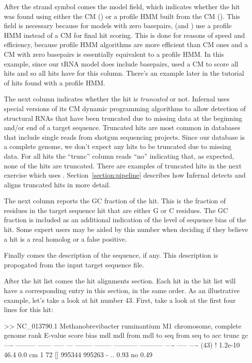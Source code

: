 After the strand symbol comes the model field, which indicates whether
the hit was found using either the CM () or a profile HMM
built from the CM (). This field is necessary because for
models with zero basepairs,  (and ) use a
profile HMM instead of a CM for final hit scoring. This is done for
reasons of speed and efficiency, because profile HMM algorithms are
more efficient than CM ones and a CM with zero basepairs is
essentially equivalent to a profile HMM. In this example, since our
tRNA model does include basepairs,  used a CM to score
all hits and so all hits have  for this column. There's an
example later in the tutorial of hits found with a profile HMM.

The next column indicates whether the hit is \emph{truncated} or
not. Infernal uses special versions of its CM dynamic programming
algorithms to allow detection of structural RNAs that have been
truncated due to missing data at the beginning and/or end of a target
sequence. Truncated hits are most common in databases that include
single reads from shotgun sequencing projects. Since our database is a
complete genome, we don't expect any hits to be truncated due to
missing data. For all hits the ``trunc'' column reads
``no'' indicating that, as expected, none of the hits are
truncated. There are examples of truncated hits in the next exercise
which uses . Section~\ref{section:pipeline} describes how
Infernal detects and aligns truncated hits in more detail.

The next column reports the GC fraction of the hit. This is the
fraction of residues in the target sequence hit that are either G or C
residues. The GC fraction is included as an additional indication of
the level of sequence bias of the hit. Some expert users may be aided
by this number when deciding if they believe a hit is a real homolog
or a false positive.

Finally comes the description of the sequence, if any. This
description is propogated from the input target sequence file.

After the hit list comes the hit alignments section. Each hit in 
the hit list will have a corresponding entry in this section, in the
same order. As an illustrative example, let's take a look at
hit number 43. First, take a look at the first four lines for this
hit: 

\begin{sreoutput}
>> NC_013790.1  Methanobrevibacter ruminantium M1 chromosome, complete genome
 rank     E-value  score  bias mdl mdl from   mdl to       seq from      seq to       acc trunc   gc
 ----   --------- ------ ----- --- -------- --------    ----------- -----------      ---- ----- ----
 (43) !   1.2e-10   46.4   0.0  cm        1       72 []      995344      995263 - .. 0.93    no 0.49
\end{sreoutput}

